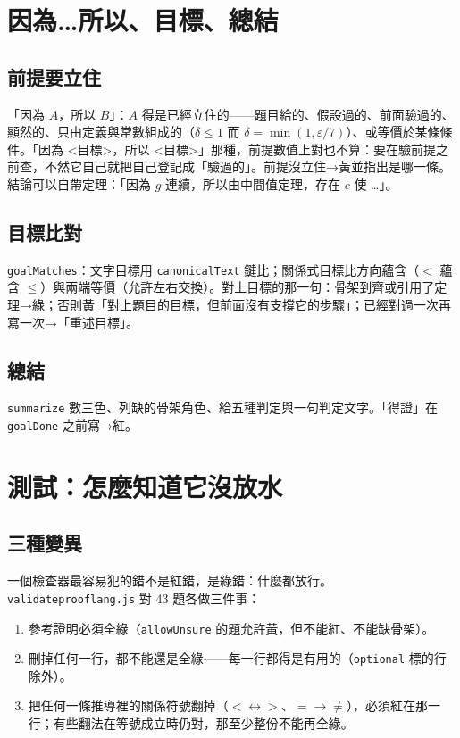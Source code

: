 \documentclass[11pt,a4paper,oneside]{book}
\renewcommand{\_}{\ifmmode\origunderscore\else\textunderscore\allowbreak\fi}
\newcommand{\code}[1]{\texttt{#1}}
\newcommand{\file}[1]{\texttt{\small #1}}
\begin{document}
\chapter{因為…所以、目標、總結}
\section{前提要立住}
「因為 $A$，所以 $B$」：$A$ 得是已經立住的——題目給的、假設過的、前面驗過的、顯然的、只由定義與常數組成的（$\delta \le 1$ 而 $\delta = \min(1, \varepsilon/7)$）、或等價於某條條件。「因為 <目標>，所以 <目標>」那種，前提數值上對也不算：要在驗前提之前查，不然它自己就把自己登記成「驗過的」。前提沒立住→黃並指出是哪一條。結論可以自帶定理：「因為 $g$ 連續，所以由中間值定理，存在 $c$ 使 …」。

\section{目標比對}
\code{goalMatches}：文字目標用 \code{canonicalText} 鍵比；關係式目標比方向蘊含（$<$ 蘊含 $\le$）與兩端等價（允許左右交換）。對上目標的那一句：骨架到齊或引用了定理→綠；否則黃「對上題目的目標，但前面沒有支撐它的步驟」；已經對過一次再寫一次→「重述目標」。

\section{總結}
\code{summarize} 數三色、列缺的骨架角色、給五種判定與一句判定文字。「得證」在 \code{goalDone} 之前寫→紅。

\chapter{測試：怎麼知道它沒放水}
\section{三種變異}
一個檢查器最容易犯的錯不是紅錯，是綠錯：什麼都放行。\file{validate\_proof\_lang.js} 對 43 題各做三件事：
\begin{enumerate}[label=\arabic*.]
  \item 參考證明必須全綠（\code{allowUnsure} 的題允許黃，但不能紅、不能缺骨架）。
  \item 刪掉任何一行，都不能還是全綠——每一行都得是有用的（\code{optional} 標的行除外）。
  \item 把任何一條推導裡的關係符號翻掉（$<\leftrightarrow>$、$=\to\ne$），必須紅在那一行；有些翻法在等號成立時仍對，那至少整份不能再全綠。
\end{enumerate}
\end{document}
